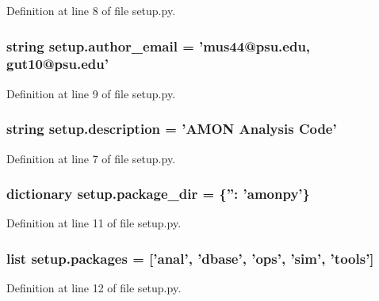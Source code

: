 Definition at line 8 of file setup.\-py.

\hypertarget{namespacesetup_aa144ac52ed417d5c65d7377e0e75673e}{
\subsubsection[{author\-\_\-email}]{\setlength{\rightskip}{0pt plus 5cm}string setup.\-author\-\_\-email = 'mus44@psu.\-edu, gut10@psu.\-edu'}}\label{namespacesetup_aa144ac52ed417d5c65d7377e0e75673e}


Definition at line 9 of file setup.\-py.

\hypertarget{namespacesetup_ade8aa54df2083113a10326ea2fe7934b}{
\subsubsection[{description}]{\setlength{\rightskip}{0pt plus 5cm}string setup.\-description = 'A\-M\-O\-N Analysis Code'}}\label{namespacesetup_ade8aa54df2083113a10326ea2fe7934b}


Definition at line 7 of file setup.\-py.

\hypertarget{namespacesetup_abf4f1022dcd783f10f7bd23ec931f32b}{
\subsubsection[{package\-\_\-dir}]{\setlength{\rightskip}{0pt plus 5cm}dictionary setup.\-package\-\_\-dir = \{''\-: 'amonpy'\}}}\label{namespacesetup_abf4f1022dcd783f10f7bd23ec931f32b}


Definition at line 11 of file setup.\-py.

\hypertarget{namespacesetup_aada4406eeab94f62c5f72fee617f0b82}{
\subsubsection[{packages}]{\setlength{\rightskip}{0pt plus 5cm}list setup.\-packages = \mbox{[}'anal', 'dbase', 'ops', 'sim', 'tools'\mbox{]}}}\label{namespacesetup_aada4406eeab94f62c5f72fee617f0b82}


Definition at line 12 of file setup.\-py.


